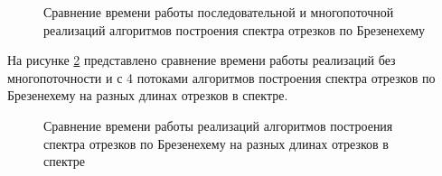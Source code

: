 \clearpage
\begin{figure}[h!]
	
	
	\caption{Сравнение времени работы последовательной и многопоточной реализаций алгоритмов построения спектра отрезков по Брезенехему}
	
	\label{fig:fig1}
	
\end{figure}

\FloatBarrier

На рисунке \ref{fig:fig2} представлено сравнение времени работы реализаций без многопоточности и с 4 потоками алгоритмов построения спектра отрезков по Брезенехему на разных длинах отрезков в спектре.

\FloatBarrier

\begin{figure}[h!]
	
	
	\caption{Сравнение времени работы реализаций алгоритмов построения спектра отрезков по Брезенехему на разных длинах отрезков в спектре}
	
	\label{fig:fig2}
	
\end{figure}

